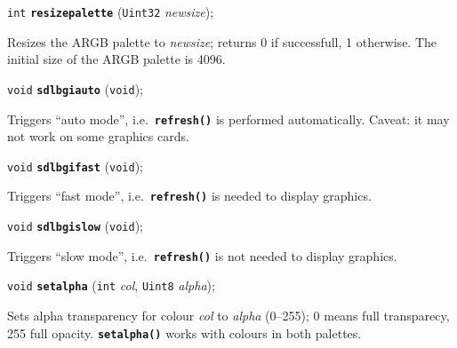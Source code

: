 \documentclass[a4paper,12pt]{article}
\newcommand{\V}{\texttt{void}}      %
\newcommand{\I}{\texttt{int}}       %
\newcommand{\Ue}{\texttt{Uint8}}    %
\newcommand{\Ut}{\texttt{Uint32}}   %
\newcommand{\func}[1]{\textbf{\texttt{#1}}}  %
\newcommand{\A}[1]{\emph{#1}}       %
\newenvironment{bgi}
{ %
  \begin{snugshade}
}
{ %
  \end{snugshade}
}
\begin{document}

\label{sec:resizepalette}

\begin{bgi}
\I{} \func{resizepalette} (\Ut{} \A{newsize});
\end{bgi}

Resizes the ARGB palette to \A{newsize}; returns 0 if successfull, 1
otherwise. The initial size of the ARGB palette is 4096.


\label{sec:sdlbgiauto}

\begin{bgi}
\V{} \func{sdlbgiauto} (\V{});
\end{bgi}

Triggers ``auto mode'', i.e.\ \func{refresh()} is performed
automatically. Caveat: it may not work on some graphics cards.


\label{sec:sdlbgifast}

\begin{bgi}
\V{} \func{sdlbgifast} (\V{});
\end{bgi}

Triggers ``fast mode'', i.e.\ \func{refresh()} is needed to display
graphics.


\label{sec:sdlbgislow}

\begin{bgi}
\V{} \func{sdlbgislow} (\V{});
\end{bgi}

Triggers ``slow mode'', i.e.\ \func{refresh()} is not needed to
display graphics.


\label{sec:setalpha}

\begin{bgi}
\V{} \func{setalpha} (\I{} \A{col}, \Ue{} \A{alpha});
\end{bgi}

Sets alpha transparency for colour \A{col} to \A{alpha} (0--255); 0
means full transparecy, 255 full opacity. \func{setalpha()} works with
colours in both palettes.
\end{document}
